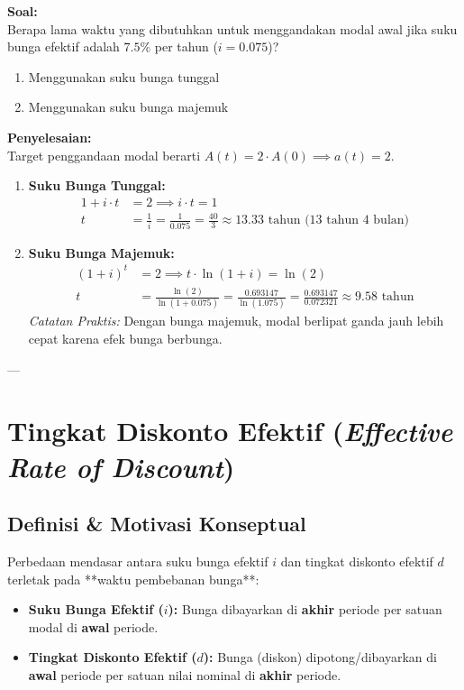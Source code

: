 \documentclass[11pt,a4paper]{article}
\begin{document}
\begin{examplebox}
\textbf{Soal:}\\
Berapa lama waktu yang dibutuhkan untuk menggandakan modal awal jika suku bunga efektif adalah $7.5\%$ per tahun ($i = 0.075$)?
\begin{enumerate}[label=(\alph*)]
    \item Menggunakan suku bunga tunggal
    \item Menggunakan suku bunga majemuk
\end{enumerate}

\vspace{0.5em}
\textbf{Penyelesaian:}\\
Target penggandaan modal berarti $A(t) = 2 \cdot A(0) \implies a(t) = 2$.
\begin{enumerate}[label=(\alph*)]
    \item \textbf{Suku Bunga Tunggal:}
    \begin{align*}
        1 + i \cdot t &= 2 \implies i \cdot t = 1 \\[0.3em]
        t &= \frac{1}{i} = \frac{1}{0.075} = \frac{40}{3} \approx 13.33 \text{ tahun (13 tahun 4 bulan)}
    \end{align*}
    \item \textbf{Suku Bunga Majemuk:}
    \begin{align*}
        (1 + i)^t &= 2 \implies t \cdot \ln(1 + i) = \ln(2) \\[0.3em]
        t &= \frac{\ln(2)}{\ln(1 + 0.075)} = \frac{0.693147}{\ln(1.075)} = \frac{0.693147}{0.072321} \approx 9.58 \text{ tahun}
    \end{align*}
    \textit{Catatan Praktis:} Dengan bunga majemuk, modal berlipat ganda jauh lebih cepat karena efek bunga berbunga.
\end{enumerate}
\end{examplebox}

---

\section{Tingkat Diskonto Efektif (\textit{Effective Rate of Discount})}

\subsection{Definisi \& Motivasi Konseptual}
Perbedaan mendasar antara suku bunga efektif $i$ dan tingkat diskonto efektif $d$ terletak pada **waktu pembebanan bunga**:
\begin{itemize}[leftmargin=1.5em]
    \item \textbf{Suku Bunga Efektif ($i$):} Bunga dibayarkan di \textbf{akhir} periode per satuan modal di \textbf{awal} periode.
    \item \textbf{Tingkat Diskonto Efektif ($d$):} Bunga (diskon) dipotong/dibayarkan di \textbf{awal} periode per satuan nilai nominal di \textbf{akhir} periode.
\end{itemize}
\end{document}
